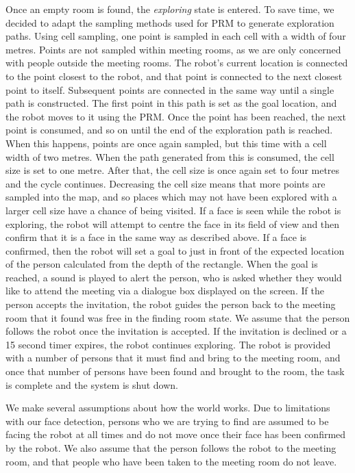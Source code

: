 \documentclass[conference]{IEEEtran}
\begin{document}
Once an empty room is found, the \emph{exploring} state is entered. To save time, we decided to adapt the sampling methods used for PRM to generate exploration paths. Using cell sampling, one point is sampled in each cell with a width of four metres. Points are not sampled within meeting rooms, as we are only concerned with people outside the meeting rooms. The robot's current location is connected to the point closest to the robot, and that point is connected to the next closest point to itself. Subsequent points are connected in the same way until a single path is constructed. The first point in this path is set as the goal location, and the robot moves to it using the PRM. Once the point has been reached, the next point is consumed, and so on until the end of the exploration path is reached. When this happens, points are once again sampled, but this time with a cell width of two metres. When the path generated from this is consumed, the cell size is set to one metre. After that, the cell size is once again set to four metres and the cycle continues. Decreasing the cell size means that more points are sampled into the map, and so places which may not have been explored with a larger cell size have a chance of being visited. If a face is seen while the robot is exploring, the robot will attempt to centre the face in its field of view and then confirm that it is a face in the same way as described above. If a face is confirmed, then the robot will set a goal to just in front of the expected location of the person calculated from the depth of the rectangle. When the goal is reached, a sound is played to alert the person, who is asked whether they would like to attend the meeting via a dialogue box displayed on the screen. If the person accepts the invitation, the robot guides the person back to the meeting room that it found was free in the finding room state. We assume that the person follows the robot once the invitation is accepted. If the invitation is declined or a 15 second timer expires, the robot continues exploring. The robot is provided with a number of persons that it must find and bring to the meeting room, and once that number of persons have been found and brought to the room, the task is complete and the system is shut down.

We make several assumptions about how the world works. Due to limitations with our face detection, persons who we are trying to find are assumed to be facing the robot at all times and do not move once their face has been confirmed by the robot. We also assume that the person follows the robot to the meeting room, and that people who have been taken to the meeting room do not leave.
\end{document}
